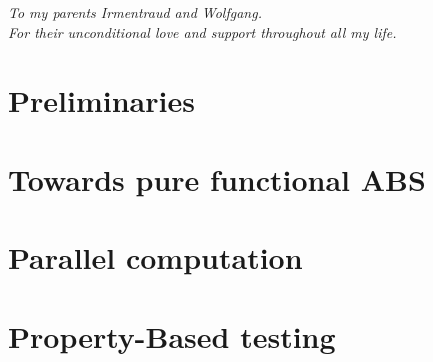 \documentclass[oneside]{book}
\begin{document}

\clearpage
\tableofcontents

\clearpage
\begin{center}
    \thispagestyle{empty}
    \vspace*{\fill}
    \textit{To my parents Irmentraud and Wolfgang. \\ For their unconditional love and support throughout all my life.}
    \vspace*{\fill}
\end{center}

\clearpage


\epigraphhead[450]{}
\part{Preliminaries}




\epigraphhead[450]{}
\part{Towards pure functional ABS}



\epigraphhead[450]{}
\part{Parallel computation}


\epigraphhead[450]{}
\part{Property-Based testing}

\end{document}
